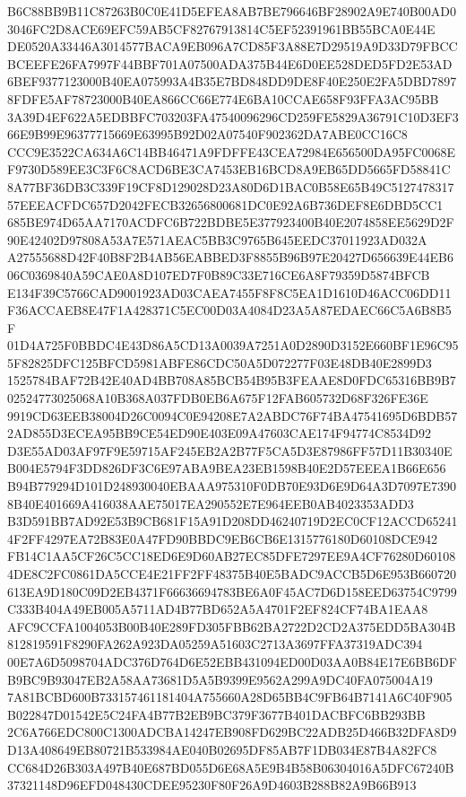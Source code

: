 \documentclass[UTF8,fontset=fandol,zihao=-4,a4paper]{ctexart}
\begin{document}
{{B6C88BB9B11C87263B0C0E41D5EFEA8AB7BE796646BF28902A9E740B00AD03046FC2D8ACE69EFC59AB5CF82767913814C5EF52391961BB55BCA0E44E
DE0520A33446A3014577BACA9EB096A7CD85F3A88E7D29519A9D33D79FBCCBCEEFE26FA7997F44BBF701A07500ADA375B44E6D0EE528DED5FD2E53AD
6BEF9377123000B40EA075993A4B35E7BD848DD9DE8F40E250E2FA5DBD78978FDFE5AF78723000B40EA866CC66E774E6BA10CCAE658F93FFA3AC95BB
3A39D4EF622A5EDBBFC703203FA47540096296CD259FE5829A36791C10D3EF366E9B99E96377715669E63995B92D02A07540F902362DA7ABE0CC16C8
CCC9E3522CA634A6C14BB46471A9FDFFE43CEA72984E656500DA95FC0068EF9730D589EE3C3F6C8ACD6BE3CA7453EB16BCD8A9EB65DD5665FD58841C
8A77BF36DB3C339F19CF8D129028D23A80D6D1BAC0B58E65B49C512747831757EEEACFDC657D2042FECB32656800681DC0E92A6B736DEF8E6DBD5CC1
685BE974D65AA7170ACDFC6B722BDBE5E377923400B40E2074858EE5629D2F90E42402D97808A53A7E571AEAC5BB3C9765B645EEDC37011923AD032A
A27555688D42F40B8F2B4AB56EABBED3F8855B96B97E20427D656639E44EB606C0369840A59CAE0A8D107ED7F0B89C33E716CE6A8F79359D5874BFCB
E134F39C5766CAD9001923AD03CAEA7455F8F8C5EA1D1610D46ACC06DD11F36ACCAEB8E47F1A428371C5EC00D03A4084D23A5A87EDAEC66C5A6B8B5F
01D4A725F0BBDC4E43D86A5CD13A0039A7251A0D2890D3152E660BF1E96C955F82825DFC125BFCD5981ABFE86CDC50A5D072277F03E48DB40E2899D3
1525784BAF72B42E40AD4BB708A85BCB54B95B3FEAAE8D0FDC65316BB9B702524773025068A10B368A037FDB0EB6A675F12FAB605732D68F326FE36E
9919CD63EEB38004D26C0094C0E94208E7A2ABDC76F74BA47541695D6BDB572AD855D3ECEA95BB9CE54ED90E403E09A47603CAE174F94774C8534D92
D3E55AD03AF97F9E59715AF245EB2A2B77F5CA5D3E87986FF57D11B30340EB004E5794F3DD826DF3C6E97ABA9BEA23EB1598B40E2D57EEEA1B66E656
B94B779294D101D248930040EBAAA975310F0DB70E93D6E9D64A3D7097E73908B40E401669A416038AAE75017EA290552E7E964EEB0AB4023353ADD3
B3D591BB7AD92E53B9CB681F15A91D208DD46240719D2EC0CF12ACCD652414F2FF4297EA72B83E0A47FD90BBDC9EB6CB6E1315776180D60108DCE942
FB14C1AA5CF26C5CC18ED6E9D60AB27EC85DFE7297EE9A4CF76280D601084DE8C2FC0861DA5CCE4E21FF2FF48375B40E5BADC9ACCB5D6E953B660720
613EA9D180C09D2EB4371F66636694783BE6A0F45AC7D6D158EED63754C9799C333B404A49EB005A5711AD4B77BD652A5A4701F2EF824CF74BA1EAA8
AFC9CCFA1004053B00B40E289FD305FBB62BA2722D2CD2A375EDD5BA304B812819591F8290FA262A923DA05259A51603C2713A3697FFA37319ADC394
00E7A6D5098704ADC376D764D6E52EBB431094ED00D03AA0B84E17E6BB6DFB9BC9B93047EB2A58AA73681D5A5B9399E9562A299A9DC40FA075004A19
7A81BCBD600B733157461181404A755660A28D65BB4C9FB64B7141A6C40F905B022847D01542E5C24FA4B77B2EB9BC379F3677B401DACBFC6BB293BB
2C6A766EDC800C1300ADCBA14247EB908FD629BC22ADB25D466B32DFA8D9D13A408649EB80721B533984AE040B02695DF85AB7F1DB034E87B4A82FC8
CC684D26B303A497B40E687BD055D6E68A5E9B4B58B06304016A5DFC67240B37321148D96EFD048430CDEE95230F80F26A9D4603B288B82A9B66B913
}}
\end{document}
